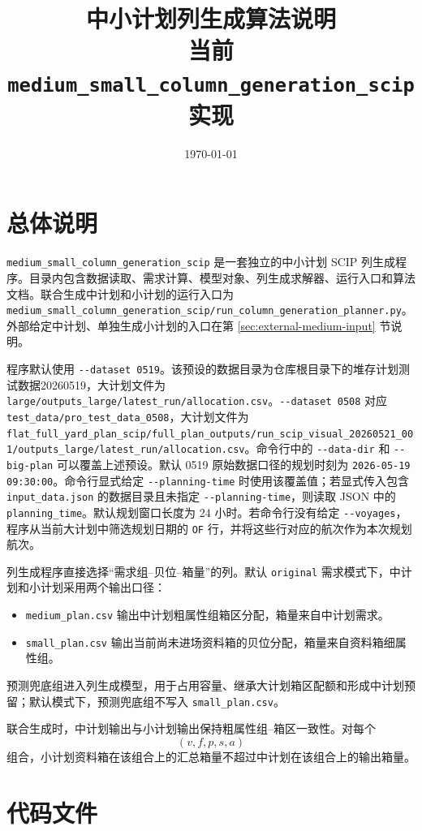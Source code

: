 \documentclass[UTF8,a4paper,11pt]{ctexart}
\title{中小计划列生成算法说明\\
\large 当前 \texttt{medium\_small\_column\_generation\_scip} 实现}
\author{}
\date{\today}
\newcommand{\code}[1]{\nolinkurl{#1}}
\begin{document}
\maketitle
\tableofcontents
\newpage

\section{总体说明}

\code{medium_small_column_generation_scip} 是一套独立的中小计划 SCIP 列生成程序。目录内包含数据读取、需求计算、模型对象、列生成求解器、运行入口和算法文档。联合生成中计划和小计划的运行入口为
\code{medium_small_column_generation_scip/run_column_generation_planner.py}。外部给定中计划、单独生成小计划的入口在第 \ref{sec:external-medium-input} 节说明。

程序默认使用 \code{--dataset 0519}。该预设的数据目录为仓库根目录下的堆存计划测试数据20260519，大计划文件为 \code{large/outputs_large/latest_run/allocation.csv}。\code{--dataset 0508} 对应 \code{test_data/pro_test_data_0508}，大计划文件为 \code{flat_full_yard_plan_scip/full_plan_outputs/run_scip_visual_20260521_001/outputs_large/latest_run/allocation.csv}。命令行中的 \code{--data-dir} 和 \code{--big-plan} 可以覆盖上述预设。默认 0519 原始数据口径的规划时刻为 \code{2026-05-19 09:30:00}。命令行显式给定 \code{--planning-time} 时使用该覆盖值；若显式传入包含 \code{input_data.json} 的数据目录且未指定 \code{--planning-time}，则读取 JSON 中的 \code{planning_time}。默认规划窗口长度为 24 小时。若命令行没有给定 \code{--voyages}，程序从当前大计划中筛选规划日期的 \code{OF} 行，并将这些行对应的航次作为本次规划航次。

列生成程序直接选择“需求组--贝位--箱量”的列。默认 \code{original} 需求模式下，中计划和小计划采用两个输出口径：
\begin{itemize}
  \item \code{medium_plan.csv} 输出中计划粗属性组箱区分配，箱量来自中计划需求。
  \item \code{small_plan.csv} 输出当前尚未进场资料箱的贝位分配，箱量来自资料箱细属性组。
\end{itemize}
预测兜底组进入列生成模型，用于占用容量、继承大计划箱区配额和形成中计划预留；默认模式下，预测兜底组不写入 \code{small_plan.csv}。

联合生成时，中计划输出与小计划输出保持粗属性组--箱区一致性。对每个
\[
(v,f,p,s,a)
\]
组合，小计划资料箱在该组合上的汇总箱量不超过中计划在该组合上的输出箱量。

\section{代码文件}
\end{document}
